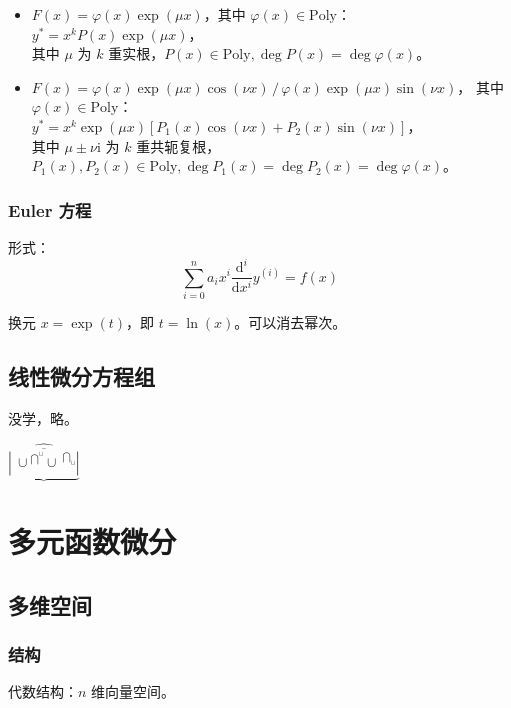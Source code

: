 \documentclass[12pt, a4paper, UTF8, openany]{ctexbook}
\newcommand{\dif}{\mathrm{d}}
\newcommand{\imunit}{\mathrm{i}}%
\begin{document}
        \begin{itemize}
            \item $F(x) = \varphi(x)\exp(\mu x)$，其中 $\varphi(x) \in \mathrm{Poly}$：\\
                $y^\ast = x^k P(x) \exp(\mu x)$，\\
                其中 $\mu$ 为 $k$ 重实根，$P(x) \in \mathrm{Poly}, \deg P(x) = \deg\varphi(x)$。
            \item $F(x) = \varphi(x)\exp(\mu x)\cos(\nu x) \, / \, \varphi(x)\exp(\mu x)\sin(\nu x)$，
                其中 $\varphi(x) \in \mathrm{Poly}$：\\
                $y^\ast = x^k\exp(\mu x)[P_1(x)\cos(\nu x) + P_2(x)\sin(\nu x)]$，\\
                其中 $\mu \pm \nu\imunit$ 为 $k$ 重共轭复根，
                $P_1(x),P_2(x) \in \mathrm{Poly}, \deg P_1(x) = \deg P_2(x) = \deg\varphi(x)$。
        \end{itemize}

        \subsection{Euler 方程}
        形式：
        $$\sum_{i = 0}^{n} a_i x^i \frac{\dif^i}{\dif x^{i}} y^{(i)} = f(x)$$

        换元 $x = \exp(t)$，即 $t = \ln(x)$。可以消去幂次。

    \section{线性微分方程组}
    没学，略。

    $\underbrace
    {
        \widehat
        {
            \overline
            {
                \left|
                \stackrel {\ } {\ \cup}
                \stackrel {\bigcap ^ \cup} {}
                \stackrel {\ } {\cup ^ {\ }}
                \stackrel {\bigcap_\cup} {}
                \right|
            }
        }
    }$

    \chapter{多元函数微分}
    \section{多维空间}
        \subsection{结构}
        代数结构：$n$ 维向量空间。
\end{document}
